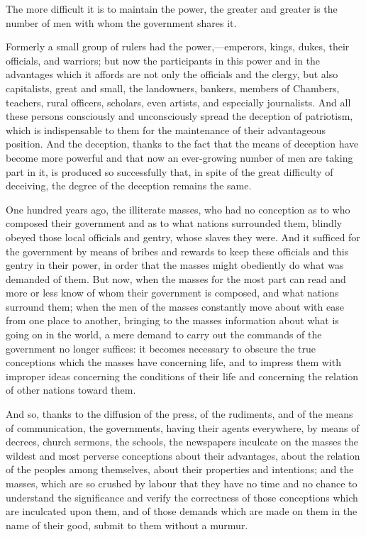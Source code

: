 \documentclass{book}
\begin{document}
The more difficult it is to maintain the power, the greater and greater is the number of men with whom the government shares it.

Formerly a small group of rulers had the power,—emperors, kings, dukes, their officials, and warriors; but now the participants in this power and in the advantages which it affords are not only the officials and the clergy, but also capitalists, great and small, the landowners, bankers, members of Chambers, teachers, rural officers, scholars, even artists, and especially journalists. And all these persons consciously and unconsciously spread the deception of patriotism, which is indispensable to them for the maintenance of their advantageous position. And the deception, thanks to the fact that the means of deception have become more powerful and that now an ever-growing number of men are taking part in it, is produced so successfully that, in spite of the great difficulty of deceiving, the degree of the deception remains the same.

One hundred years ago, the illiterate masses, who had no conception as to who composed their government and as to what nations surrounded them, blindly obeyed those local officials and gentry, whose slaves they were. And it sufficed for the government by means of bribes and rewards to keep these officials and this gentry in their power, in order that the masses might obediently do what was demanded of them. But now, when the masses for the most part can read and more or less know of whom their government is composed, and what nations surround them; when the men of the masses constantly move about with ease from one place to another, bringing to the masses information about what is going on in the world, a mere demand to carry out the commands of the government no longer suffices: it becomes necessary to obscure the true conceptions which the masses have concerning life, and to impress them with improper ideas concerning the conditions of their life and concerning the relation of other nations toward them.

And so, thanks to the diffusion of the press, of the rudiments, and of the means of communication, the governments, having their agents everywhere, by means of decrees, church sermons, the schools, the newspapers inculcate on the masses the wildest and most perverse conceptions about their advantages, about the relation of the peoples among themselves, about their properties and intentions; and the masses, which are so crushed by labour that they have no time and no chance to understand the significance and verify the correctness of those conceptions which are inculcated upon them, and of those demands which are made on them in the name of their good, submit to them without a murmur.
\end{document}
